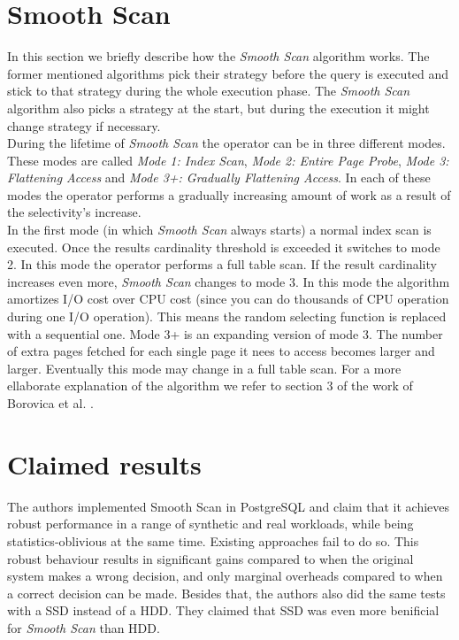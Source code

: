 \documentclass[a4paper,11pt,titlepage]{article}
\begin{document}
\section{Smooth Scan}
In this section we briefly describe how the \emph{Smooth Scan} algorithm works. The former mentioned algorithms pick their strategy before the query is executed and stick to that strategy during the whole execution phase. The \emph{Smooth Scan} algorithm also picks a strategy at the start, but during the execution it might change strategy if necessary. \\
During the lifetime of \emph{Smooth Scan} the operator can be in three different modes. These modes are called \emph{Mode 1: Index Scan}, \emph{Mode 2: Entire Page Probe}, \emph{Mode 3: Flattening Access} and \emph{Mode 3+: Gradually Flattening Access}. In each of these modes the operator performs a gradually increasing amount of work as a result of the selectivity's increase. \\
In the first mode (in which \emph{Smooth Scan} always starts) a normal index scan is executed. Once the results cardinality threshold is exceeded it switches to mode 2. In this mode the operator performs a full table scan. If the result cardinality increases even more, \emph{Smooth Scan} changes to mode 3. In this mode the algorithm amortizes I/O cost over CPU cost (since you can do thousands of CPU operation during one I/O operation). This means the random selecting function is replaced with a sequential one. Mode 3+ is an expanding version of mode 3. The number of extra pages fetched for each single page it nees to access becomes larger and larger. Eventually this mode may change in a full table scan. For a more ellaborate explanation of the algorithm we refer to section 3 of the work of Borovica et al. \cite{smoothscan}.

\section{Claimed results}
The authors implemented Smooth Scan in PostgreSQL and claim that it achieves robust performance in a range of synthetic and real workloads, while being statistics-oblivious at the same time. Existing approaches fail to do so. This robust behaviour results in significant gains compared to when the original system makes a wrong decision, and only marginal overheads compared to when a correct decision can be made. Besides that, the authors also did the same tests with a SSD instead of a HDD. They claimed that SSD was even more benificial for \emph{Smooth Scan} than HDD.
\end{document}
